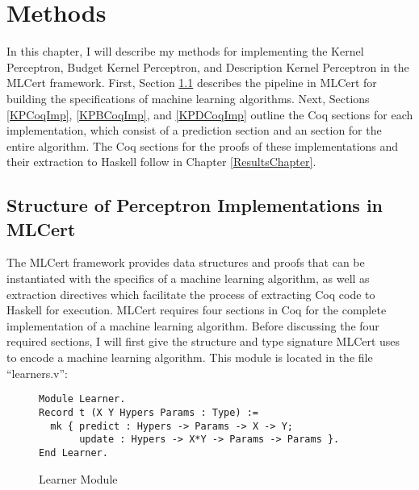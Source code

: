 \chapter{Methods}\label{MethodsChapter}
In this chapter, I will describe my methods for implementing the Kernel Perceptron, Budget Kernel Perceptron, and Description Kernel Perceptron in the MLCert framework. First, Section \ref{MLCertStruct} describes the pipeline in MLCert for building the specifications of machine learning algorithms. Next, Sections \ref{KPCoqImp}, \ref{KPBCoqImp}, and \ref{KPDCoqImp} outline the Coq sections for each implementation, which consist of a prediction section and an section for the entire algorithm. The Coq sections for the proofs of these implementations and their extraction to Haskell follow in Chapter \ref{ResultsChapter}.
\section{Structure of Perceptron Implementations in MLCert}\label{MLCertStruct}
The MLCert framework provides data structures and proofs that can be instantiated with the specifics of a machine learning algorithm, as well as extraction directives which facilitate the process of extracting Coq code to Haskell for execution. MLCert requires four sections in Coq for the complete implementation of a machine learning algorithm. Before discussing the four required sections, I will first give the structure and type signature MLCert uses to encode a machine learning algorithm. This module is located in the file ``learners.v'':

\begin{figure}
    \caption{Learner Module}
    \label{LearnerDef}
    \begin{lstlisting}
Module Learner.
Record t (X Y Hypers Params : Type) :=
  mk { predict : Hypers -> Params -> X -> Y;
       update : Hypers -> X*Y -> Params -> Params }.
End Learner.
    \end{lstlisting}
\end{figure}


